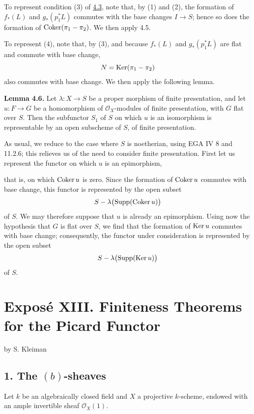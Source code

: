 To represent condition (3) of \hyperlink{sga6.e12.lem.4-3}{4.3}, note that, by (1) and (2), the formation
of \(f_*(L)\) and \(g_*(p_1^*L)\) commutes with the base changes
\(I\to S\); hence so does the formation of
\(\operatorname{Coker}(\pi_1-\pi_2)\). We then apply 4.5.

To represent (4), note that, by (3), and because \(f_*(L)\) and
\(g_*(p_1^*L)\) are flat and commute with base change,
\[
  N=\operatorname{Ker}(\pi_1-\pi_2)
\]
also commutes with base change. We then apply the following lemma.

\textbf{Lemma 4.6.} Let \(\lambda:X\to S\) be a proper morphism of finite
presentation, and let \(u:F\to G\) be a homomorphism of
\(\mathcal O_X\)-modules of finite presentation, with \(G\) flat over
\(S\). Then the subfunctor \(S_1\) of \(S\) on which \(u\) is an
isomorphism is representable by an open subscheme of \(S\), of finite
presentation.

As usual, we reduce to the case where \(S\) is noetherian, using EGA IV 8
and 11.2.6; this relieves us of the need to consider finite presentation.
First let us represent the functor on which \(u\) is an epimorphism,

\newpage
that is, on which \(\operatorname{Coker} u\) is zero. Since the formation of
\(\operatorname{Coker} u\) commutes with base change, this functor is represented by the
open subset
\[
  S-\lambda\bigl(\operatorname{Supp}(\operatorname{Coker} u)\bigr)
\]
of \(S\). We may therefore suppose that \(u\) is already an epimorphism.
Using now the hypothesis that \(G\) is flat over \(S\), we find that the
formation of \(\operatorname{Ker} u\) commutes with base change; consequently, the functor
under consideration is represented by the open subset
\[
  S-\lambda\bigl(\operatorname{Supp}(\operatorname{Ker} u)\bigr)
\]
of \(S\).

\newpage
{}\section*{Expos\'e XIII. Finiteness Theorems for the Picard Functor}
\begin{center}
by S. Kleiman
\end{center}

\subsection*{1. The \texorpdfstring{\((b)\)}{(b)}-sheaves}

Let \(k\) be an algebraically closed field and \(X\) a projective
\(k\)-scheme, endowed with an ample invertible sheaf \(\mathcal O_X(1)\).

